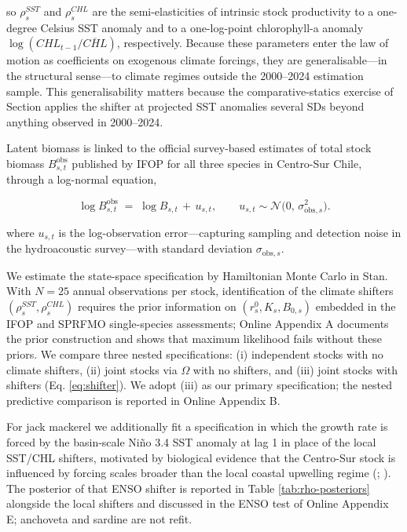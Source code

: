 \documentclass[
  11pt,
]{article}
\begin{document}
so \(\rho_s^{SST}\) and \(\rho_s^{CHL}\) are the semi-elasticities of intrinsic stock productivity to a one-degree Celsius SST anomaly and to a one-log-point chlorophyll-a anomaly \(\log(CHL_{t-1}/\overline{CHL})\), respectively. Because these parameters enter the law of motion as coefficients on exogenous climate forcings, they are generalisable---in the structural sense---to climate regimes outside the 2000--2024 estimation sample. This generalisability matters because the comparative-statics exercise of Section \emph{} applies the shifter at projected SST anomalies several SDs beyond anything observed in 2000--2024.

Latent biomass is linked to the official survey-based estimates of total stock biomass \(B_{s,t}^{\text{obs}}\) published by IFOP for all three species in Centro-Sur Chile, through a log-normal equation,

\begin{equation}
\log B_{s,t}^{\text{obs}} \;=\; \log B_{s,t} \,+\, u_{s,t}, \qquad u_{s,t} \sim \mathcal{N}\!\big(0,\, \sigma_{\text{obs},s}^2\big). \label{eq:obs}
\end{equation}

where \(u_{s,t}\) is the log-observation error---capturing sampling and detection noise in the hydroacoustic survey---with standard deviation \(\sigma_{\text{obs},s}\).

We estimate the state-space specification by Hamiltonian Monte Carlo in Stan. With \(N=25\) annual observations per stock, identification of the climate shifters \((\rho^{SST}_s, \rho^{CHL}_s)\) requires the prior information on \((r^{0}_s, K_s, B_{0,s})\) embedded in the IFOP and SPRFMO single-species assessments; Online Appendix A documents the prior construction and shows that maximum likelihood fails without these priors. We compare three nested specifications: (i) independent stocks with no climate shifters, (ii) joint stocks via \(\Omega\) with no shifters, and (iii) joint stocks with shifters (Eq. \eqref{eq:shifter}). We adopt (iii) as our primary specification; the nested predictive comparison is reported in Online Appendix B.

For jack mackerel we additionally fit a specification in which the growth rate is forced by the basin-scale Niño 3.4 SST anomaly at lag 1 in place of the local SST/CHL shifters, motivated by biological evidence that the Centro-Sur stock is influenced by forcing scales broader than the local coastal upwelling regime (; ). The posterior of that ENSO shifter is reported in Table \ref{tab:rho-posteriors} alongside the local shifters and discussed in the ENSO test of Online Appendix E; anchoveta and sardine are not refit.
\end{document}
